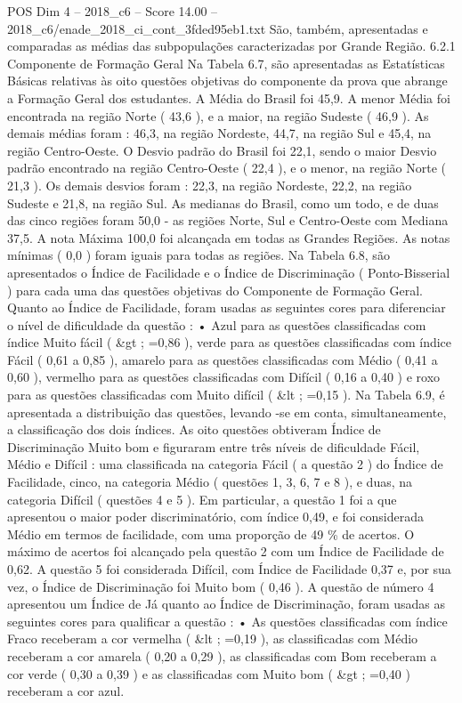 \begin{textsample}{POS Dim 4 – 2018\_c6 – Score 14.00 – 2018\_c6/enade\_2018\_ci\_cont\_3fded95eb1.txt}
São, também, apresentadas e comparadas as médias das subpopulações caracterizadas por Grande Região. 6.2.1 Componente de Formação Geral Na Tabela 6.7, são apresentadas as Estatísticas Básicas relativas às oito questões objetivas do componente da prova que abrange a Formação Geral dos estudantes.
A Média do Brasil foi 45,9.
A menor Média foi encontrada na região Norte ( 43,6 ), e a maior, na região Sudeste ( 46,9 ).
As demais médias foram : 46,3, na região Nordeste, 44,7, na região Sul e 45,4, na região Centro-Oeste.
O Desvio padrão do Brasil foi 22,1, sendo o maior Desvio padrão encontrado na região Centro-Oeste ( 22,4 ), e o menor, na região Norte ( 21,3 ).
Os demais desvios foram : 22,3, na região Nordeste, 22,2, na região Sudeste e 21,8, na região Sul.
As medianas do Brasil, como um todo, e de duas das cinco regiões foram 50,0 - as regiões Norte, Sul e Centro-Oeste com Mediana 37,5.
A nota Máxima 100,0 foi alcançada em todas as Grandes Regiões.
As notas mínimas ( 0,0 ) foram iguais para todas as regiões.
Na Tabela 6.8, são apresentados o Índice de Facilidade e o Índice de Discriminação ( Ponto-Bisserial ) para cada uma das questões objetivas do Componente de Formação Geral.
Quanto ao Índice de Facilidade, foram usadas as seguintes cores para diferenciar o nível de dificuldade da questão : • Azul para as questões classificadas com índice Muito fácil ( \&gt ; =0,86 ), verde para as questões classificadas com índice Fácil ( 0,61 a 0,85 ), amarelo para as questões classificadas com Médio ( 0,41 a 0,60 ), vermelho para as questões classificadas com Difícil ( 0,16 a 0,40 ) e roxo para as questões classificadas com Muito difícil ( \&lt ; =0,15 ).
Na Tabela 6.9, é apresentada a distribuição das questões, levando -se em conta, simultaneamente, a classificação dos dois índices.
As oito questões obtiveram Índice de Discriminação Muito bom e figuraram entre três níveis de dificuldade Fácil, Médio e Difícil : uma classificada na categoria Fácil ( a questão 2 ) do Índice de Facilidade, cinco, na categoria Médio ( questões 1, 3, 6, 7 e 8 ), e duas, na categoria Difícil ( questões 4 e 5 ).
Em particular, a questão 1 foi a que apresentou o maior poder discriminatório, com índice 0,49, e foi considerada Médio em termos de facilidade, com uma proporção de 49 \% de acertos.
O máximo de acertos foi alcançado pela questão 2 com um Índice de Facilidade de 0,62.
A questão 5 foi considerada Difícil, com Índice de Facilidade 0,37 e, por sua vez, o Índice de Discriminação foi Muito bom ( 0,46 ).
A questão de número 4 apresentou um Índice de Já quanto ao Índice de Discriminação, foram usadas as seguintes cores para qualificar a questão : • As questões classificadas com índice Fraco receberam a cor vermelha ( \&lt ; =0,19 ), as classificadas com Médio receberam a cor amarela ( 0,20 a 0,29 ), as classificadas com Bom receberam a cor verde ( 0,30 a 0,39 ) e as classificadas com Muito bom ( \&gt ; =0,40 ) receberam a cor azul.

\end{textsample}
